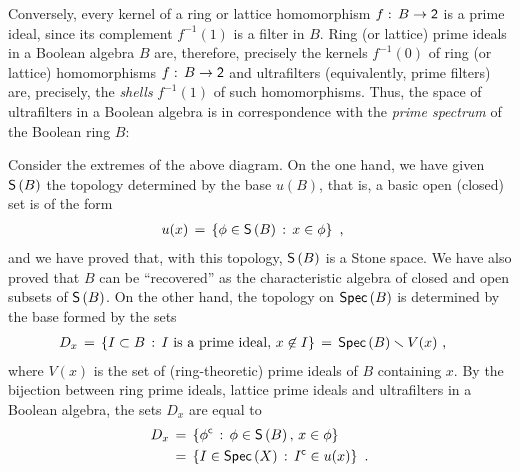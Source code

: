 Conversely, every kernel of a ring or lattice homomorphism
$f:\,B\rightarrow\mathsf{2}$ is a prime ideal, since its complement $f^{-1}(1)$
is a filter in $B$. Ring (or lattice) prime ideals in a Boolean algebra $B$
are, therefore, precisely the kernels $f^{-1}(0)$ of ring (or lattice)
homomorphisms $f:\,B\rightarrow\mathsf{2}$ and ultrafilters (equivalently,
prime filters) are, precisely, the \emph{shells} $f^{-1}(1)$ of such
homomorphisms. Thus, the space of ultrafilters in a Boolean algebra is
in correspondence with the \emph{prime spectrum} of the Boolean ring $B$:
\begin{center}
\end{center}
%
Consider the extremes of the above diagram. On the one hand, we have
given $\mathsf{S}\left(B\right)$ the topology determined by the base $u(B)$, that is,
a basic open (closed) set is of the form
\begin{align*}
	u(x) & \,=\,\left\lbrace\phi\in\mathsf{S}\left(B\right)\,:\,x\in\phi\right\rbrace
	\text{ ,}
\end{align*}
%
and we have proved that, with this topology, $\mathsf{S}\left(B\right)$ is a Stone
space. We have also proved that $B$ can be ``recovered'' as the
characteristic algebra of closed and open subsets of $\mathsf{S}\left(B\right)$.
On the other hand, the topology on $\mathsf{Spec}\left(B\right)$ is determined by the base
formed by the sets
\begin{align*}
	D_{x} & \,=\,\left\lbrace I\subset B\,:\,
		I\text{ is a prime ideal},\,x\not\in I\right\rbrace
		\,=\,\mathsf{Spec}\left(B\right)\smallsetminus V(x)
	\text{ ,}
\end{align*}
%
where $V(x)$ is the set of (ring-theoretic) prime ideals of $B$ containing
$x$. By the bijection between ring prime ideals, lattice prime ideals and
ultrafilters in a Boolean algebra, the sets $D_{x}$ are equal to
\begin{equation}
	\label{eq:zariskibasicopen}
	\begin{aligned}
		D_{x} & \,=\,\left\lbrace{\phi}^{\mathsf{c}}\,:\,
				\phi\in\mathsf{S}\left(B\right),\,x\in\phi\right\rbrace \\
		& \,=\,\left\lbrace I\in\mathsf{Spec}\left(X\right)\,:\,
				{I}^{\mathsf{c}}\in u(x)\right\rbrace
	\text{ .}
	\end{aligned}
\end{equation}
